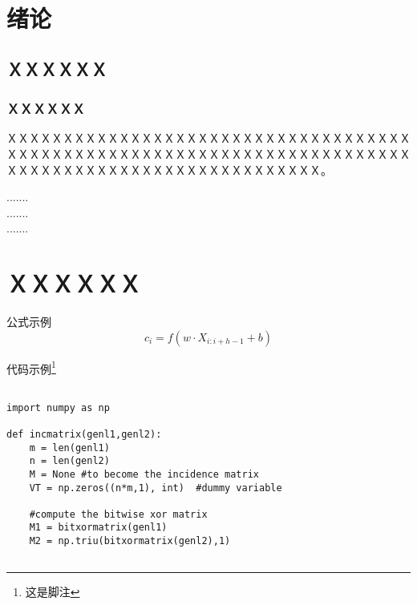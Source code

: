 \documentclass[a4paper]{ltxdoc}
\numberwithin{equation}{section}
\begin{document}
{
\setcounter{page}{1}
\pretocmd{\section}{\clearpage \vspace*{-2.0em}}{}{}

\setlength{\parindent}{2em}
\setlength{\parskip}{0.5em}
\setlength{\baselineskip}{22pt}

\section{绪论}
\subsection{ＸＸＸＸＸＸ}
\subsubsection{ＸＸＸＸＸＸ}
ＸＸＸＸＸＸＸＸＸＸＸＸＸＸＸＸＸＸＸＸＸＸＸＸＸＸＸＸＸＸＸＸＸＸＸＸＸＸＸＸＸＸＸＸＸＸＸＸＸＸＸＸＸＸＸＸＸＸＸＸＸＸＸＸＸＸＸＸＸＸＸＸＸＸＸＸＸＸＸＸＸＸＸＸＸＸＸＸＸＸＸＸＸＸＸＸＸＸＸＸ。

\begin{center}
	.......\\
	.......\\
	.......
\end{center}

\section{ＸＸＸＸＸＸ}

公式示例
\begin{equation}
	c_i=f(w \cdot X_{i:i+h-1} +b)
\end{equation}

代码示例\footnote{这是脚注}
\begin{verbatim}

import numpy as np

def incmatrix(genl1,genl2):
    m = len(genl1)
    n = len(genl2)
    M = None #to become the incidence matrix
    VT = np.zeros((n*m,1), int)  #dummy variable

    #compute the bitwise xor matrix
    M1 = bitxormatrix(genl1)
    M2 = np.triu(bitxormatrix(genl2),1)


\end{verbatim}}
\end{document}
